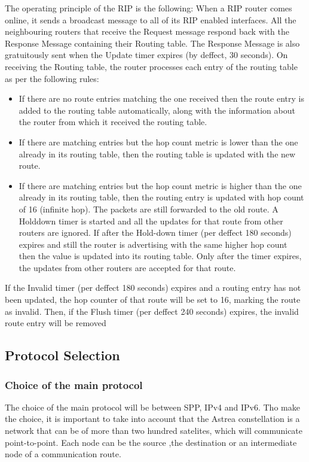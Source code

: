 The operating principle of the RIP is the following: When a RIP router comes online, it sends a broadcast message to all of its RIP enabled interfaces. All the neighbouring routers that receive the Request message respond back with the Response Message containing their Routing table. The Response Message is also gratuitously sent when the Update timer expires (by deffect, 30 seconds). On receiving the Routing table, the router processes each entry of the routing table as per the following rules:

\begin{itemize}
\item{} If there are no route entries matching the one received then the route entry is added to the routing table automatically, along with the information about the router from which it received the routing table.
\item{} If there are matching entries but the hop count metric is lower than the one already in its routing table, then the routing table is updated with the new route.
\item{} If there are matching entries but the hop count metric is higher than the one already in its routing table, then the routing entry is updated with hop count of 16 (infinite hop). The packets are still forwarded to the old route. A Holddown timer is started and all the updates for that route from other routers are ignored. If after the Hold-down timer (per deffect 180 seconds) expires and still the router is advertising with the same higher hop count then the value is updated into its routing table. Only after the timer expires, the updates from other routers are accepted for that route.
\end{itemize}

If the Invalid timer (per deffect 180 seconds) expires and a routing entry has not been updated, the hop counter of that route will be set to 16, marking the route as invalid. Then, if the Flush timer (per deffect 240 seconds) expires, the invalid route entry will be removed

\subsection{Protocol Selection}

\subsubsection{Choice of the main protocol}
The choice of the main protocol will be between SPP, IPv4 and IPv6. Tho make the choice, it is important to take into account that the Astrea constellation is a network that can be of more than two hundred satelites, which will communicate point-to-point. Each node can be the source ,the destination or an intermediate node of a communication route.

